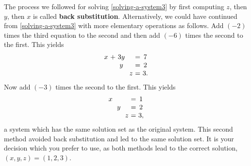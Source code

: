 \begin{solution}
  The process we followed for solving \eqref{solving-a-system3} by first
  computing $z$, then $y$, then $x$ is called \textbf{back
    substitution}.  Alternatively, we could
  have continued from \eqref{solving-a-system3} with more elementary
  operations as follows. Add $(-2) $ times the third
  equation to the second and then add $(-6) $ times the
  second to the first. This yields
  \begin{equation*}
    \allowbreak
    \begin{array}{c@{~}c@{~}c@{~}c@{~}c@{~}c@{~}c}
      x&+&3y&&&=&7 \\
       &&y&&&=&2 \\
       &&&&z&=&3.
    \end{array}
  \end{equation*}
  Now add $(-3) $ times the second to the first. This yields
  \begin{equation*}
    \allowbreak
    \begin{array}{c@{~}c@{~}c@{~}c@{~}c@{~}c@{~}c}
      x&&&&&=&1 \\
       &&y&&&=&2 \\
       &&&&z&=&3,
    \end{array}
  \end{equation*}
  a system which has the same solution set as the original
  system. This second method avoided back substitution and led to the
  same solution set. It is your decision which you prefer to use, as
  both methods lead to the correct solution,
  $(x,y,z) = (1,2,3)$.
\end{solution}


